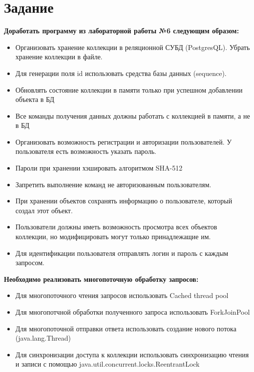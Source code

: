 \documentclass[a4paper,12pt]{article}
\begin{document}
	\maketitle
	
	
	\tableofcontents 
	
	\vspace{1cm}
	
	\section*{Задание}
	\textbf{Доработать программу из лабораторной работы №6 следующим образом:} 
	\begin{itemize}
	    \item Организовать хранение коллекции в реляционной СУБД (PostgresQL). Убрать хранение коллекции в файле.
		\item Для генерации поля id использовать средства базы данных (sequence).
		\item Обновлять состояние коллекции в памяти только при успешном добавлении объекта в БД
		\item Все команды получения данных должны работать с коллекцией в памяти, а не в БД
		\item Организовать возможность регистрации и авторизации пользователей. У пользователя есть возможность указать пароль.
		\item Пароли при хранении хэшировать алгоритмом SHA-512
		\item Запретить выполнение команд не авторизованным пользователям.
		\item При хранении объектов сохранять информацию о пользователе, который создал этот объект.
		\item Пользователи должны иметь возможность просмотра всех объектов коллекции, но модифицировать могут только принадлежащие им.
		\item Для идентификации пользователя отправлять логин и пароль с каждым запросом.
	\end{itemize}
	
	\textbf{Необходимо реализовать многопоточную обработку запросов:}
	\begin{itemize}
	    \item Для многопоточного чтения запросов использовать Cached thread pool
		\item Для многопотчной обработки полученного запроса использовать ForkJoinPool
		\item Для многопоточной отправки ответа использовать создание нового потока (java.lang.Thread)
		\item Для синхронизации доступа к коллекции использовать синхронизацию чтения и записи с помощью java.util.concurrent.locks.ReentrantLock	
	\end{itemize}
	
\end{document}
